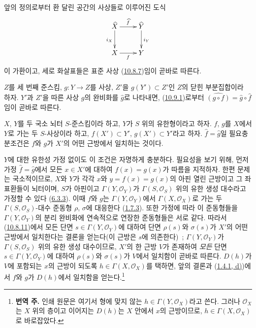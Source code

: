 \begin{env}[10.9.2]
\label{I.10.9.2-ko}
앞의 정의로부터 환 달린 공간의 사상들로 이루어진 도식
\[
  \label{I.10.9.2.1-ko}
  \xymatrix{
    \widehat X\ar[r]^{\widehat f}\ar[d]_{i_X} &
    \widehat Y\ar[d]^{i_Y}\\
    X\ar[r]_f &
    Y
  }
\]
이 가환이고, 세로 화살표들은 표준 사상
(\hyperref[I.10.8.7-ko]{10.8.7})임이 곧바로 따른다.
\end{env}

\begin{env}[10.9.3]
\label{I.10.9.3-ko}
$Z$를 세 번째 준스킴, $g:Y\to Z$를 사상, $Z'$을
$g(Y')\subset Z'$인 $Z$의 닫힌 부분집합이라 하자. $Y'$과 $Z'$을
따른 사상 $g$의 완비화를 $\widehat g$로 나타내면,
(\hyperref[I.10.9.1-ko]{10.9.1})로부터
$\widehat{(g\circ f)}=\widehat g\circ\widehat f$임이 곧바로 따른다.
\end{env}

\begin{proposition}[10.9.4]
\label{I.10.9.4-ko}
$X$, $Y$를 두 국소 뇌터 $S$-준스킴이라 하고, $Y$가 $S$ 위의
유한형이라고 하자. $f$, $g$를 $X$에서 $Y$로 가는 두 $S$-사상이라
하고, $f(X')\subset Y'$, $g(X')\subset Y'$라고 하자.
$\widehat f=\widehat g$일 필요충분조건은 $f$와 $g$가 $X'$의 어떤
근방에서 일치하는 것이다.
\end{proposition}

$Y$에 대한 유한성 가정 없이도 이 조건은 자명하게 충분하다.
필요성을 보기 위해, 먼저 가정 $\widehat f=\widehat g$에서 모든
$x\in X'$에 대하여 $f(x)=g(x)$가 따름을 지적하자. 한편 문제는
국소적이므로, $X$와 $Y$가 각각 $x$와 $y=f(x)=g(x)$의 아핀 열린
근방이고 그 좌표환들이 뇌터이며, $S$가 아핀이고
$\Gamma(Y,\mathscr{O}_Y)$가 $\Gamma(S,\mathscr{O}_S)$ 위의 유한 생성
대수라고 가정할 수 있다
(\hyperref[I.6.3.3-ko]{6.3.3}). 이때 $f$와 $g$는
$\Gamma(Y,\mathscr{O}_Y)$에서 $\Gamma(X,\mathscr{O}_X)$로 가는 두
$\Gamma(S,\mathscr{O}_S)$-대수 준동형 $\rho$, $\sigma$에 대응한다
(\hyperref[I.1.7.3-ko]{1.7.3}). 또한 가정에 따라 이 준동형들을
$\Gamma(Y,\mathscr{O}_Y)$의 분리 완비화에 연속적으로 연장한
준동형들은 서로 같다. 따라서 (\hyperref[I.10.8.11-ko]{10.8.11})에서
모든 단면 $s\in\Gamma(Y,\mathscr{O}_Y)$에 대하여 단면 $\rho(s)$와
$\sigma(s)$가 $X'$의 어떤 근방에서 일치한다는 결론을 얻는다(이
근방은 $s$에 의존한다)~; $\Gamma(Y,\mathscr{O}_Y)$가
$\Gamma(S,\mathscr{O}_S)$ 위의 유한 생성 대수이므로, $X'$의 한 근방
$V$가 존재하여 \emph{모든} 단면 $s\in\Gamma(Y,\mathscr{O}_Y)$에
대하여 $\rho(s)$와 $\sigma(s)$가 $V$에서 일치함이 곧바로 따른다.
$D(h)$가 $V$에 포함되는 $x$의 근방이 되도록
$h\in\Gamma(X,\mathscr{O}_X)$를 택하면, 앞의 결론과
(\hyperref[I.1.4.1-ko]{1.4.1, d)})에서 $f$와 $g$가 $D(h)$에서
일치함을 얻는다.\footnote{\textbf{번역 주.} 인쇄 원문은 여기서 형에
맞지 않는 $h\in\Gamma(Y,\mathscr{O}_X)$라고 쓴다. 그러나
$\mathscr{O}_X$는 $X$ 위의 층이고 이어지는 $D(h)$는 $X$ 안에서
$x$의 근방이므로, $h\in\Gamma(X,\mathscr{O}_X)$로 바로잡았다.}

